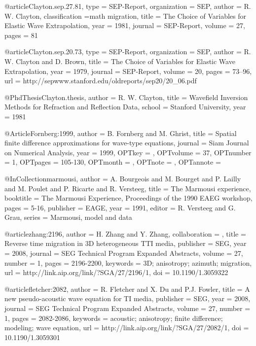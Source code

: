 {@article{Clayton.sep.27.81,
  type =	 {SEP-Report},
  organization = {SEP},
  author =	 {R. W. Clayton},
  classification ={math migration},
  title =	 {The Choice of Variables for Elastic Wave
                  Extrapolation},
  year =	 1981,
  journal =	 {SEP-Report},
  volume =	 27,
  pages =	 81
}

@article{Clayton.sep.20.73,
  type =	 {SEP-Report},
  organization = {SEP},
  author =	 {R. W. Clayton and D. Brown},
  title =	 {The Choice of Variables for Elastic Wave
                  Extrapolation},
  year =	 1979,
  journal =	 {SEP-Report},
  volume =	 20,
  pages =	 {73--96},
  url =
                  {http://sepwww.stanford.edu/oldreports/sep20/20_06.pdf}
}

@PhdThesis{Clayton.thesis,
  author =	 {R. W. Clayton},
  title =	 {Wavefield Inversion Methods for Refraction and
                  Reflection Data},
  school =	 {Stanford University},
  year =	 1981
}

@Article{Fornberg:1999,
  author = 	 {B. Fornberg and M. Ghrist},
  title = 	 {Spatial finite difference approximations for
                  wave-type equations},
  journal = 	 {Siam Journal on Numerical Analysis},
  year = 	 {1999},
  OPTkey = 	 {},
  OPTvolume = 	 {37},
  OPTnumber = 	 {1},
  OPTpages = 	 {105-130},
  OPTmonth = 	 {},
  OPTnote = 	 {},
  OPTannote = 	 {}
}

@InCollection{marmousi,
  author =	 {A. Bourgeois and M. Bourget and P. Lailly and
                  M. Poulet and P. Ricarte and R. Versteeg},
  title =	 {The {M}armousi experience},
  booktitle =	 {The Marmousi Experience, Proceedings of the 1990
                  EAEG workshop},
  pages =	 {5-16},
  publisher =    {EAGE},
  year =	 1991,
  editor =	 {R. Versteeg and G. Grau},
  series =	 {Marmousi, model and data}
}

@article{zhang:2196,
author = {H. Zhang and Y. Zhang},
collaboration = {},
title = {Reverse time migration in 3{D} heterogeneous {TTI} media},
publisher = {SEG},
year = {2008},
journal = {SEG Technical Program Expanded Abstracts},
volume = {27},
number = {1},
pages = {2196-2200},
keywords = {3D; anisotropy; azimuth; migration},
url = {http://link.aip.org/link/?SGA/27/2196/1},
doi = {10.1190/1.3059322}
}

@article{fletcher:2082,
  author =	 {R. Fletcher and X. Du and P.J. Fowler},
  title =	 {A new pseudo-acoustic wave equation for {TI} media},
  publisher =	 {SEG},
  year =	 2008,
  journal =	 {SEG Technical Program Expanded Abstracts},
  volume =	 27,
  number =	 1,
  pages =	 {2082-2086},
  keywords =	 {acoustic; anisotropy; finite difference; modeling;
                  wave equation},
  url =		 {http://link.aip.org/link/?SGA/27/2082/1},
  doi =		 {10.1190/1.3059301}
}

}
